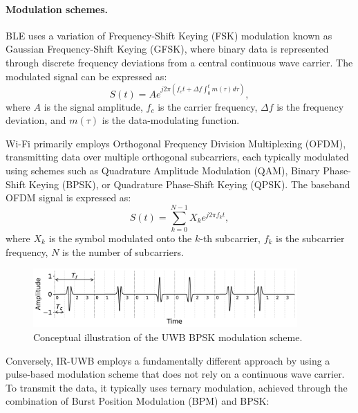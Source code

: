 \paragraph{Modulation schemes.}

BLE uses a variation of Frequency-Shift Keying (FSK) modulation known as Gaussian Frequency-Shift Keying (GFSK), where binary data is represented through discrete frequency deviations from a central continuous wave carrier. The modulated signal can be expressed as:
\begin{equation}
S(t) = A e^{j 2\pi \left(f_c t + \Delta f \int_{0}^{t} m(\tau) d\tau\right)},
\end{equation}
where $A$ is the signal amplitude, $f_c$ is the carrier frequency, $\Delta f$ is the frequency deviation, and $m(\tau)$ is the data-modulating function. 

Wi-Fi primarily employs Orthogonal Frequency Division Multiplexing (OFDM), transmitting data over multiple orthogonal subcarriers, each typically modulated using schemes such as Quadrature Amplitude Modulation (QAM), Binary Phase-Shift Keying (BPSK), or Quadrature Phase-Shift Keying (QPSK). The baseband OFDM signal is expressed as:
\begin{equation}
S(t) = \sum_{k=0}^{N-1} X_k e^{j 2 \pi f_k t},
\end{equation}
where $X_k$ is the symbol modulated onto the $k$-th subcarrier, $f_k$ is the subcarrier frequency,
$N$ is the number of subcarriers.

\begin{figure}[tbh]
\includegraphics[width=0.9\textwidth]{Figures/theoretical_background/uwb_bpsk.pdf}
\centering
\caption{Conceptual illustration of the UWB BPSK modulation scheme.}
\label{fig:uwb-mod}
\end{figure}

Conversely, IR-UWB employs a fundamentally different approach by using a pulse-based modulation scheme that does not rely on a continuous wave carrier. To transmit the data, it typically uses ternary modulation, achieved through the combination of Burst Position Modulation (BPM) and BPSK:

